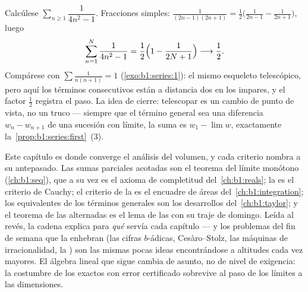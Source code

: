 \begin{example}\label{ex:b1:series:oddtelescope}
Calcúlese $\sum_{n \geq 1} \dfrac{1}{4n^2 - 1}$. Fracciones simples:
$\frac{1}{(2n-1)(2n+1)} = \frac12\bigl(\frac{1}{2n-1} -
\frac{1}{2n+1}\bigr)$, luego
\[
\sum_{n=1}^{N} \frac{1}{4n^2 - 1}
= \frac12\Bigl(1 - \frac{1}{2N+1}\Bigr)
\longrightarrow \frac12 .
\]
Compárese con $\sum \frac{1}{n(n+1)} = 1$
(\cref{exo:b1:series:1}): el mismo esqueleto telescópico, pero aquí
los términos consecutivos están a distancia dos en los impares, y el
factor $\frac12$ registra el paso. La idea de cierre: telescopar es
un cambio de punto de vista, no un truco --- siempre que el término
general sea una diferencia $w_n - w_{n+1}$ de una sucesión con
límite, la suma es $w_1 - \lim w$, exactamente
la~\cref{prop:b1:series:first}~(3).
\end{example}

\begin{remark}
Este capítulo es donde converge el análisis del volumen, y cada
criterio nombra a su antepasado. Las sumas parciales acotadas son el
teorema del límite monótono (\cref{ch:b1:seq}), que a su vez es el
axioma de completitud del~\cref{ch:b1:reals}; la  es el criterio de Cauchy; el criterio de la  es el
encuadre de áreas del~\cref{ch:b1:integration}; los equivalentes de
los términos generales son los desarrollos del~\cref{ch:b1:taylor}; y
el teorema de las alternadas es el lema de las 
con su traje de domingo. Leída al revés, la cadena explica para
\emph{qué} servía cada capítulo --- y los problemas del fin de semana
que la enhebran (las cifras $b$-ádicas, Cesàro--Stolz, las máquinas de
irracionalidad, la ) son las mismas pocas ideas
encontrándose a altitudes cada vez mayores. El álgebra lineal que
sigue cambia de asunto, no de nivel de exigencia: la costumbre de los
 exactos con error certificado sobrevive al paso de los
límites a las dimensiones.
\end{remark}

